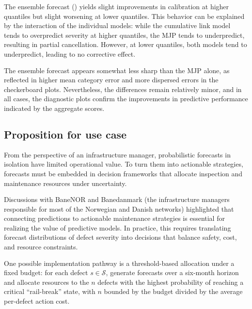 The ensemble forecast () yields slight improvements in calibration at higher quantiles but slight worsening at lower quantiles.
This behavior can be explained by the interaction of the individual models: while the cumulative link model tends to overpredict severity at higher quantiles, the MJP tends to underpredict, resulting in partial cancellation. However, at lower quantiles, both models tend to underpredict, leading to no corrective effect.

The ensemble forecast appears somewhat less sharp than the MJP alone, as reflected in higher mean category error and more dispersed errors in the checkerboard plots.
Nevertheless, the differences remain relatively minor, and in all cases, the diagnostic plots confirm the improvements in predictive performance indicated by the aggregate scores.

\FloatBarrier

\subsection{Proposition for use case} \label{sec:proposition_for_use}
From the perspective of an infrastructure manager, probabilistic forecasts in isolation have limited operational value. 
To turn them into actionable strategies, forecasts must be embedded in decision frameworks that allocate inspection and maintenance resources under uncertainty.

Discussions with BaneNOR and Banedanmark (the infrastructure managers responsible for most of the Norwegian and Danish networks) highlighted that connecting predictions to actionable maintenance strategies is essential for realizing the value of predictive models. In practice, this requires translating forecast distributions of defect severity into decisions that balance safety, cost, and resource constraints. 

One possible implementation pathway is a threshold-based allocation under a fixed budget: for each defect $s\in\mathcal{S}$, generate forecasts over a six-month horizon and allocate resources to the $n$ defects with the highest probability of reaching a critical “rail-break” state, with $n$ bounded by the budget divided by the average per-defect action cost.

